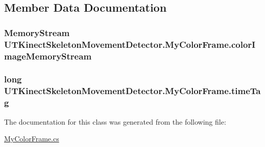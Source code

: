 \subsection{Member Data Documentation}
\hypertarget{classUTKinectSkeletonMovementDetector_1_1MyColorFrame_a380ba506814b7d4bc05b4cc47cca4b6b}{
\subsubsection[{color\-Image\-Memory\-Stream}]{\setlength{\rightskip}{0pt plus 5cm}Memory\-Stream U\-T\-Kinect\-Skeleton\-Movement\-Detector.\-My\-Color\-Frame.\-color\-Image\-Memory\-Stream\hspace{0.3cm}{\ttfamily [private]}}}\label{classUTKinectSkeletonMovementDetector_1_1MyColorFrame_a380ba506814b7d4bc05b4cc47cca4b6b}
\hypertarget{classUTKinectSkeletonMovementDetector_1_1MyColorFrame_af4cf6545d2ed2d17b72d585a09e055b4}{
\subsubsection[{time\-Tag}]{\setlength{\rightskip}{0pt plus 5cm}long U\-T\-Kinect\-Skeleton\-Movement\-Detector.\-My\-Color\-Frame.\-time\-Tag\hspace{0.3cm}{\ttfamily [private]}}}\label{classUTKinectSkeletonMovementDetector_1_1MyColorFrame_af4cf6545d2ed2d17b72d585a09e055b4}


The documentation for this class was generated from the following file\-:\begin{DoxyCompactItemize}
\item 
\hyperlink{MyColorFrame_8cs}{My\-Color\-Frame.\-cs}\end{DoxyCompactItemize}
